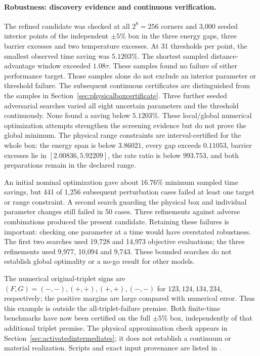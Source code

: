 \documentclass[11pt]{article}
\begin{document}
\paragraph{Robustness: discovery evidence and continuous verification.}
The refined candidate was checked at all $2^8=256$ corners and 3,000
seeded interior points of the independent $\pm5\%$ box in the three
energy gaps, three barrier excesses and two temperature excesses.
At 31 thresholds per point, the smallest observed time saving was
$5.1203\%$. The shortest sampled distance-advantage window exceeded
$1.08\tau$. These samples found no failure of either performance target.
Those samples alone do not exclude an interior parameter or threshold failure.
The subsequent continuous certificates are distinguished from the samples
in Section~\ref{sec:physicalboxcertificate}.
Three further seeded adversarial searches varied all eight uncertain
parameters and the threshold continuously. None found a saving below
$5.1203\%$. These local/global numerical optimization attempts strengthen
the screening evidence but do not prove the global minimum.
The physical range constraints are interval-certified for
the whole box: the energy span is below $3.86021$, every gap exceeds
$0.11053$, barrier excesses lie in $[2.00836,5.92209]$, the rate ratio
is below $993.753$, and both preparations remain in the declared range.

An initial nominal optimization gave about $16.76\%$ minimum sampled time
savings, but 441 of 1,256 subsequent perturbation cases failed at least
one target or range constraint. A second search guarding the physical
box and individual parameter changes still failed in 50 cases.
Three refinements against adverse combinations produced the present
candidate. Retaining these failures is important: checking one parameter
at a time would have overstated robustness. The first two searches used
19,728 and 14,973 objective evaluations; the three refinements used
9,977, 10,094 and 9,743. These bounded searches do not establish global
optimality or a no-go result for other models.

The numerical original-triplet signs are $(F,G)=(-,-),(+,+),(+,+),(-,-)$
for $123,124,134,234$, respectively; the positive margins are large
compared with numerical error. Thus this example is outside the
all-triplet-failure premise. Both finite-time benchmarks have now been certified on the full
$\pm5\%$ box, independently of that additional triplet premise. The physical
approximation check appears in Section~\ref{sec:activatedintermediates};
it does not establish a continuum or material realization.
Scripts and exact input provenance are listed in .
\end{document}
